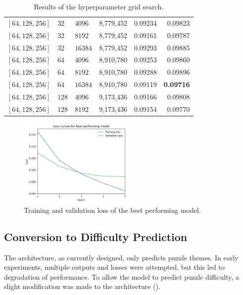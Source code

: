 \begin{table}[H]
\begin{adjustbox}{width=\textwidth}
\begin{tabular}{lll|rrr}
      $[64, 128, 256 ]$& $32$ & $4096$ & 8,779,452 & 0.09234 & 0.09823 \\
      $[64, 128, 256 ]$& $32$ & $8192$ & 8,779,452 & 0.09161 & 0.09787 \\
      $[64, 128, 256 ]$& $32$ & $16384$ & 8,779,452 & 0.09293 & 0.09885 \\[0.1cm]

      $[64, 128, 256 ]$& $64$ & $4096$ & 8,910,780 & 0.09253 & 0.09860 \\
      $[64, 128, 256 ]$& $64$ & $8192$ & 8,910,780 & 0.09288 & 0.09896 \\
      \rowcolor{lightgray} $[64, 128, 256 ]$& $64$ & $16384$ & 8,910,780 & 0.09119 & \textbf{0.09716} \\
     
      $[64, 128, 256 ]$& $128$  & $4096$ & 9,173,436 & 0.09166 & 0.09808 \\
      $[64, 128, 256 ]$& $128$ & $8192$ & 9,173,436 & 0.09154 & 0.09770 \\

    \end{tabular}
  \end{adjustbox}
  \caption{Results of the hyperparameter grid search.}
  \label{tabHyperparam}
\end{table}


\begin{figure}[H]
  \centering
  \includegraphics[width=0.5\textwidth]{project/img/loss_curves.png}
  \caption{Training and validation loss of the best performing model.}
  \label{lossCurves}
\end{figure}


\subsection{Conversion to Difficulty Prediction}\label{mlS23}

The architecture, as currently designed, only predicts puzzle themes. In early
experiments, multiple outputs and losses were attempted, but this led to
degradation of performance. To allow the model to predict puzzle difficulty, a
slight modification was made to the architecture (). 

